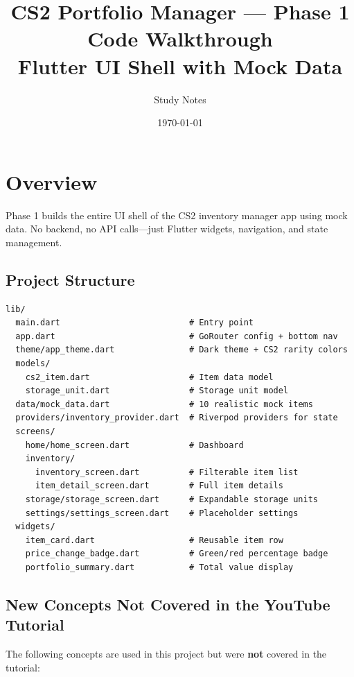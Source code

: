 \documentclass[11pt, a4paper]{article}
\title{\textbf{CS2 Portfolio Manager --- Phase 1 Code Walkthrough} \\ \large Flutter UI Shell with Mock Data}
\author{Study Notes}
\date{\today}
\begin{document}
\maketitle
\tableofcontents
\newpage

\section{Overview}

Phase 1 builds the entire UI shell of the CS2 inventory manager app using mock data. No backend, no API calls---just Flutter widgets, navigation, and state management.

\subsection{Project Structure}

\begin{lstlisting}[numbers=none]
lib/
  main.dart                          # Entry point
  app.dart                           # GoRouter config + bottom nav
  theme/app_theme.dart               # Dark theme + CS2 rarity colors
  models/
    cs2_item.dart                    # Item data model
    storage_unit.dart                # Storage unit model
  data/mock_data.dart                # 10 realistic mock items
  providers/inventory_provider.dart  # Riverpod providers for state
  screens/
    home/home_screen.dart            # Dashboard
    inventory/
      inventory_screen.dart          # Filterable item list
      item_detail_screen.dart        # Full item details
    storage/storage_screen.dart      # Expandable storage units
    settings/settings_screen.dart    # Placeholder settings
  widgets/
    item_card.dart                   # Reusable item row
    price_change_badge.dart          # Green/red percentage badge
    portfolio_summary.dart           # Total value display
\end{lstlisting}

\subsection{New Concepts Not Covered in the YouTube Tutorial}

The following concepts are used in this project but were \textbf{not} covered in the tutorial:
\end{document}
